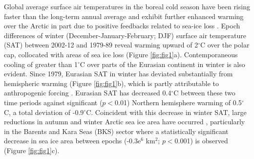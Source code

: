 \documentclass{nature}
\begin{document}
Global average surface air temperatures in the boreal cold season have been rising faster than the long-term annual average \cite{wallace12} and exhibit further enhanced warming over the Arctic in part due to positive feedbacks related to sea-ice loss \cite{screen10,cohen14}. Epoch differences of winter (December-January-February; DJF) surface air temperature (SAT) between 2002-12 and 1979-89 reveal warming upward of 2$^\circ$C over the polar cap, collocated with areas of sea ice loss (Figure \ref{fig:fig1}a). Contemporaneous cooling of greater than 1$^\circ$C over parts of the Eurasian continent in winter is also evident. Since 1979, Eurasian SAT in winter has deviated substantially from hemispheric warming (Figure \ref{fig:fig1}b), which is partly attributable to anthropogenic forcing \cite{gillett08,qian15}. Eurasian SAT has decreased 0.4$^\circ$C between these two time periods against significant ($p<$0.01)  Northern hemisphere warming of 0.5$^\circ$C, a total deviation of -0.9$^\circ$C. Coincident with this decrease in winter SAT, large reductions in autumn and winter Arctic sea ice area have occurred \cite{simmonds15}, particularly in the Barents and Kara Seas (BKS) sector where a statistically significant decrease in sea ice area between epochs (-0.3e$^6$ km$^2$; $p<$0.001) is observed (Figure \ref{fig:fig1}c). %


\end{document}

